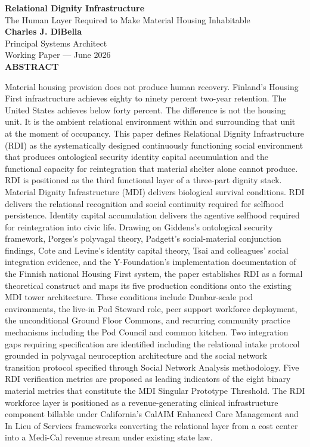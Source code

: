 \documentclass[12pt, letterpaper]{article}
\begin{document}
\begin{titlepage}
\begin{center}
{\LARGE \textbf{Relational Dignity Infrastructure}}\\[6pt]
{\large The Human Layer Required to Make Material Housing Inhabitable}\\[0.5cm]
{\normalsize \textbf{Charles J. DiBella}}\\[0.01cm]
{\normalsize Principal Systems Architect}\\[0.01cm]
{\normalsize Working Paper --- June 2026}\\[0.3cm]
\textbf{ABSTRACT}
\vspace{0.2cm}
\end{center}
\begin{minipage}{0.95\textwidth}
\noindent

Material housing provision does not produce human recovery. Finland's Housing First infrastructure achieves eighty to ninety percent two-year retention. The United States achieves below forty percent. The difference is not the housing unit. It is the ambient relational environment within and surrounding that unit at the moment of occupancy. This paper defines Relational Dignity Infrastructure (RDI) as the systematically designed continuously functioning social environment that produces ontological security identity capital accumulation and the functional capacity for reintegration that material shelter alone cannot produce. RDI is positioned as the third functional layer of a three-part dignity stack. Material Dignity Infrastructure (MDI) delivers biological survival conditions. RDI delivers the relational recognition and social continuity required for selfhood persistence. Identity capital accumulation delivers the agentive selfhood required for reintegration into civic life. Drawing on Giddens's ontological security framework, Porges's polyvagal theory, Padgett's social-material conjunction findings, Cote and Levine's identity capital theory, Tsai and colleagues' social integration evidence, and the Y-Foundation's implementation documentation of the Finnish national Housing First system, the paper establishes RDI as a formal theoretical construct and maps its five production conditions onto the existing MDI tower architecture. These conditions include Dunbar-scale pod environments, the live-in Pod Steward role, peer support workforce deployment, the unconditional Ground Floor Commons, and recurring community practice mechanisms including the Pod Council and common kitchen. Two integration gaps requiring specification are identified including the relational intake protocol grounded in polyvagal neuroception architecture and the social network transition protocol specified through Social Network Analysis methodology. Five RDI verification metrics are proposed as leading indicators of the eight binary material metrics that constitute the MDI Singular Prototype Threshold. The RDI workforce layer is positioned as a revenue-generating clinical infrastructure component billable under California's CalAIM Enhanced Care Management and In Lieu of Services frameworks converting the relational layer from a cost center into a Medi-Cal revenue stream under existing state law.


\end{minipage}
\end{titlepage}
\end{document}
